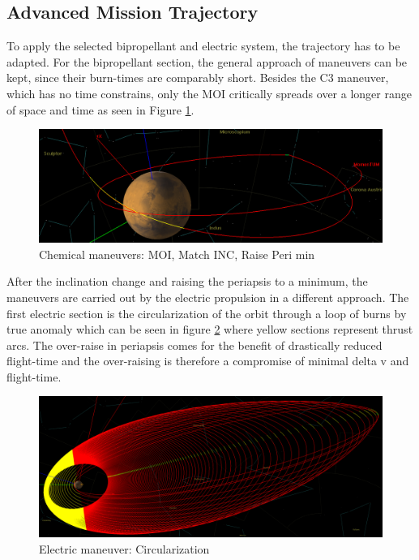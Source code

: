 \documentclass[conference]{IEEEtran}
\begin{document}
\subsection{Advanced Mission Trajectory}
To apply the selected bipropellant and electric system, the trajectory has to be adapted. For the bipropellant section, the general approach of maneuvers can be kept, since their burn-times are comparably short. Besides the C3 maneuver, which has no time constrains, only the MOI critically spreads over a longer range of space and time as seen in Figure \ref{fig:chem-overview}.

\begin{figure}[H]
  \centering
  \includegraphics[width=\linewidth]{img/chem_overview.png}
  \caption{Chemical maneuvers: MOI, Match INC, Raise Peri min}
  \label{fig:chem-overview}
\end{figure}

After the inclination change and raising the periapsis to a minimum, the maneuvers are carried out by the electric propulsion in a different approach. The first electric section is the circularization of the orbit through a loop of burns by true anomaly which can be seen in figure \ref{fig:circularization} where yellow sections represent thrust arcs. The over-raise in periapsis comes for the benefit of drastically reduced flight-time and the over-raising is therefore a compromise of minimal delta v and flight-time.

\begin{figure}[H]
  \centering
  \includegraphics[width=\linewidth]{img/el_circularization.png}
  \caption{Electric maneuver: Circularization}
  \label{fig:circularization}
\end{figure}
\end{document}
